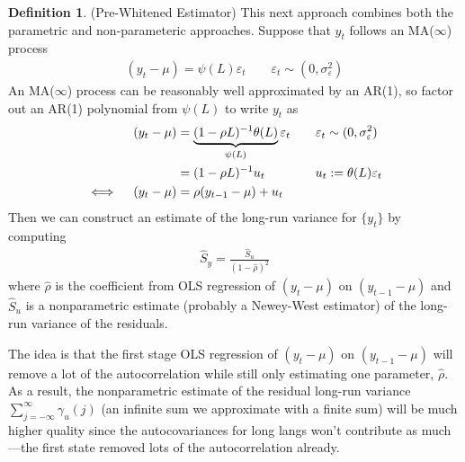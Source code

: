 \documentclass[12pt]{article}
\theoremstyle{plain}
\theoremstyle{definition}
\newtheorem{defn}[thm]{Definition}
\theoremstyle{remark}
\begin{document}
\begin{defn}(Pre-Whitened Estimator)
This next approach combines both the parametric and non-parameteric
approaches. Suppose that $y_t$ follows an MA($\infty$) process
\begin{align*}
  (y_t -\mu) = \psi(L)\varepsilon_t
  \qquad \varepsilon_t\sim (0,\sigma^2_\varepsilon)
\end{align*}
An MA($\infty$) process can be reasonably well approximated by an AR(1),
so factor out an AR(1) polynomial from $\psi(L)$ to write $y_t$ as
\begin{align}
  (y_t  - \mu) &=
  \underbrace{(1-\rho L)^{-1} \theta(L)}_{\psi(L)}
  \varepsilon_t
  \qquad
  \varepsilon_t\sim (0,\sigma^2_\varepsilon)
  \notag
  \\
  &=
  (1-\rho L)^{-1} u_t
  \qquad\qquad
  u_t := \theta(L)\varepsilon_t
  \label{prewhiten}
  \\
  \iff\quad
  (y_t -\mu) &= \rho (y_{t-1}-\mu) + u_t
  \notag
\end{align}
Then we can construct an estimate of the long-run variance for $\{y_t\}$
by computing
\begin{align*}
  \hat{S}_y = \frac{\hat{S}_u}{(1-\hat{\rho})^2}
\end{align*}
where $\hat{\rho}$ is the coefficient from OLS regression of
$(y_t-\mu)$ on $(y_{t-1}-\mu)$ and $\hat{S}_u$ is a nonparametric
estimate (probably a Newey-West estimator) of the long-run variance of
the residuals.

The idea is that the first stage OLS regression of $(y_t-\mu)$ on
$(y_{t-1}-\mu)$ will remove a lot of the autocorrelation while still
only estimating one parameter, $\hat{\rho}$. As a result, the
nonparametric estimate of the residual long-run variance
$\sum_{j=-\infty}^\infty\gamma_u(j)$ (an infinite sum we approximate
with a finite sum) will be much higher quality since the autocovariances
for long langs won't contribute as much---the first state removed lots
of the autocorrelation already.
\end{defn}
\end{document}
